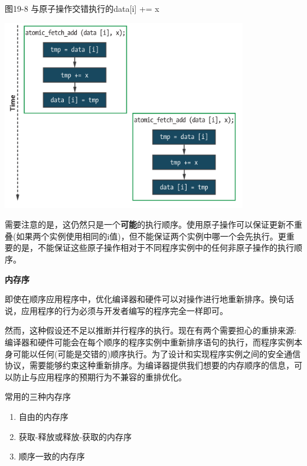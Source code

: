 \hspace*{\fill} \par %
图19-8 与原子操作交错执行的data[i] += x
\begin{center}
	\includegraphics[width=0.8\textwidth]{content/chapter-19/images/5}
\end{center}

需要注意的是，这仍然只是一个\textbf{可能}的执行顺序。使用原子操作可以保证更新不重叠(如果两个实例使用相同的i值)，但不能保证两个实例中哪一个会先执行。更重要的是，不能保证这些原子操作相对于不同程序实例中的任何非原子操作的执行顺序。\par

\hspace*{\fill} \par %
\textbf{内存序}

即使在顺序应用程序中，优化编译器和硬件可以对操作进行地重新排序。换句话说，应用程序的行为必须与开发者编写的程序完全一样即可。\par

然而，这种假设还不足以推断并行程序的执行。现在有两个需要担心的重排来源:编译器和硬件可能会在每个顺序的程序实例中重新排序语句的执行，而程序实例本身可能以任何(可能是交错的)顺序执行。为了设计和实现程序实例之间的安全通信协议，需要能够约束这种重新排序。为编译器提供我们想要的内存顺序的信息，可以防止与应用程序的预期行为不兼容的重排优化。\par

常用的三种内存序\par

\begin{enumerate}
	\item 自由的内存序
	\item 获取-释放或释放-获取的内存序
	\item 顺序一致的内存序
\end{enumerate}

